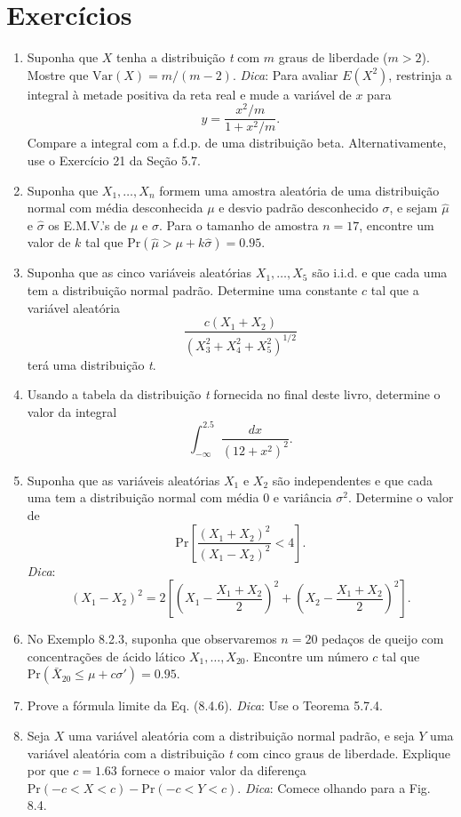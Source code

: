 \section*{Exercícios}

\begin{enumerate}
    \item Suponha que $X$ tenha a distribuição \textit{t} com $m$ graus de liberdade ($m > 2$). Mostre que $\text{Var}(X) = m/(m-2)$. \textit{Dica}: Para avaliar $E(X^2)$, restrinja a integral à metade positiva da reta real e mude a variável de $x$ para
    $$ y = \frac{x^2/m}{1 + x^2/m}. $$
    Compare a integral com a f.d.p. de uma distribuição beta. Alternativamente, use o Exercício 21 da Seção 5.7.

    \item Suponha que $X_1, \dots, X_n$ formem uma amostra aleatória de uma distribuição normal com média desconhecida $\mu$ e desvio padrão desconhecido $\sigma$, e sejam $\hat{\mu}$ e $\hat{\sigma}$ os E.M.V.'s de $\mu$ e $\sigma$. Para o tamanho de amostra $n=17$, encontre um valor de $k$ tal que $\text{Pr}(\hat{\mu} > \mu + k\hat{\sigma}) = 0.95$.
    
    \item Suponha que as cinco variáveis aleatórias $X_1, \dots, X_5$ são i.i.d. e que cada uma tem a distribuição normal padrão. Determine uma constante $c$ tal que a variável aleatória
    $$ \frac{c(X_1 + X_2)}{(X_3^2 + X_4^2 + X_5^2)^{1/2}} $$
    terá uma distribuição \textit{t}.

    \item Usando a tabela da distribuição \textit{t} fornecida no final deste livro, determine o valor da integral
    $$ \int_{-\infty}^{2.5} \frac{dx}{(12 + x^2)^2}. $$
    
    \item Suponha que as variáveis aleatórias $X_1$ e $X_2$ são independentes e que cada uma tem a distribuição normal com média 0 e variância $\sigma^2$. Determine o valor de
    $$ \text{Pr}\left[\frac{(X_1 + X_2)^2}{(X_1 - X_2)^2} < 4\right]. $$
    \textit{Dica}:
    $$ (X_1 - X_2)^2 = 2\left[ \left(X_1 - \frac{X_1 + X_2}{2}\right)^2 + \left(X_2 - \frac{X_1 + X_2}{2}\right)^2 \right]. $$
    
    \item No Exemplo 8.2.3, suponha que observaremos $n=20$ pedaços de queijo com concentrações de ácido lático $X_1, \dots, X_{20}$. Encontre um número $c$ tal que $\text{Pr}(\bar{X}_{20} \le \mu + c\sigma') = 0.95$.
    
    \item Prove a fórmula limite da Eq. (8.4.6). \textit{Dica}: Use o Teorema 5.7.4.
    
    \item Seja $X$ uma variável aleatória com a distribuição normal padrão, e seja $Y$ uma variável aleatória com a distribuição \textit{t} com cinco graus de liberdade. Explique por que $c=1.63$ fornece o maior valor da diferença $\text{Pr}(-c < X < c) - \text{Pr}(-c < Y < c)$. \textit{Dica}: Comece olhando para a Fig. 8.4.
 
\end{enumerate}